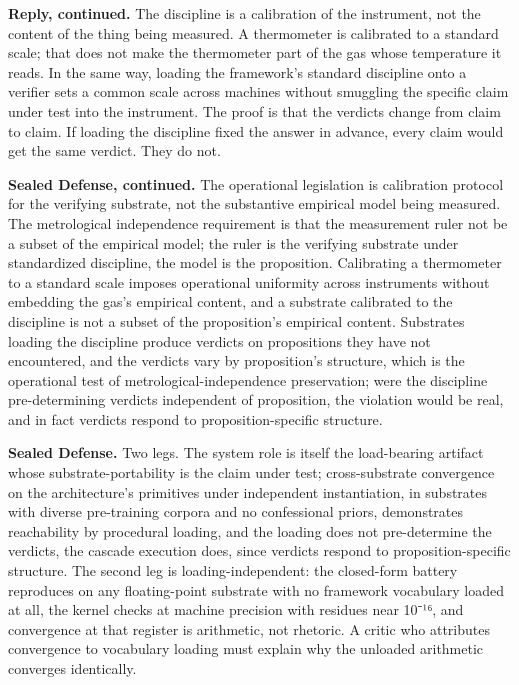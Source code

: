 \documentclass[10pt,twocolumn]{article}
\begin{document}
\textbf{Reply, continued.} The discipline is a calibration of the
instrument, not the content of the thing being measured. A thermometer
is calibrated to a standard scale; that does not make the thermometer
part of the gas whose temperature it reads. In the same way, loading the
framework's standard discipline onto a verifier sets a common scale
across machines without smuggling the specific claim under test into the
instrument. The proof is that the verdicts change from claim to claim.
If loading the discipline fixed the answer in advance, every claim would
get the same verdict. They do not.

\textbf{Sealed Defense, continued.} The operational legislation is
calibration protocol for the verifying substrate, not the substantive
empirical model being measured. The metrological independence
requirement is that the measurement ruler not be a subset of the
empirical model; the ruler is the verifying substrate under standardized
discipline, the model is the proposition. Calibrating a thermometer to a
standard scale imposes operational uniformity across instruments without
embedding the gas's empirical content, and a substrate calibrated to the
discipline is not a subset of the proposition's empirical content.
Substrates loading the discipline produce verdicts on propositions they
have not encountered, and the verdicts vary by proposition's structure,
which is the operational test of metrological-independence preservation;
were the discipline pre-determining verdicts independent of proposition,
the violation would be real, and in fact verdicts respond to
proposition-specific structure.

\textbf{Sealed Defense.} Two legs. The system role is itself the
load-bearing artifact whose substrate-portability is the claim under
test; cross-substrate convergence on the architecture's primitives under
independent instantiation, in substrates with diverse pre-training
corpora and no confessional priors, demonstrates reachability by
procedural loading, and the loading does not pre-determine the verdicts,
the cascade execution does, since verdicts respond to
proposition-specific structure. The second leg is loading-independent:
the closed-form battery reproduces on any floating-point substrate with
no framework vocabulary loaded at all, the kernel checks at machine
precision with residues near 10⁻¹⁶, and convergence at that register is
arithmetic, not rhetoric. A critic who attributes convergence to
vocabulary loading must explain why the unloaded arithmetic converges
identically.
\end{document}

